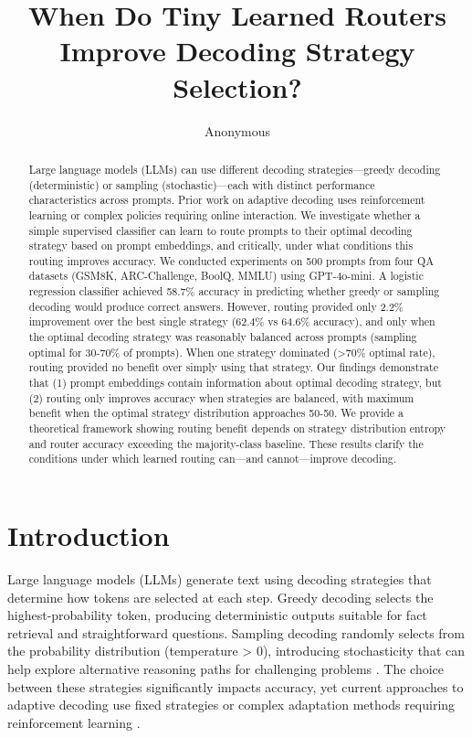 \documentclass[11pt,letterpaper]{article}
\title{When Do Tiny Learned Routers Improve Decoding Strategy Selection?}
\author{Anonymous}
\date{}
\begin{document}
\maketitle

\begin{abstract}
Large language models (LLMs) can use different decoding strategies---greedy decoding (deterministic) or sampling (stochastic)---each with distinct performance characteristics across prompts. Prior work on adaptive decoding uses reinforcement learning or complex policies requiring online interaction. We investigate whether a simple supervised classifier can learn to route prompts to their optimal decoding strategy based on prompt embeddings, and critically, under what conditions this routing improves accuracy. We conducted experiments on 500 prompts from four QA datasets (GSM8K, ARC-Challenge, BoolQ, MMLU) using GPT-4o-mini. A logistic regression classifier achieved 58.7\% accuracy in predicting whether greedy or sampling decoding would produce correct answers. However, routing provided only 2.2\% improvement over the best single strategy (62.4\% vs 64.6\% accuracy), and only when the optimal decoding strategy was reasonably balanced across prompts (sampling optimal for 30-70\% of prompts). When one strategy dominated (>70\% optimal rate), routing provided no benefit over simply using that strategy. Our findings demonstrate that (1) prompt embeddings contain information about optimal decoding strategy, but (2) routing only improves accuracy when strategies are balanced, with maximum benefit when the optimal strategy distribution approaches 50-50. We provide a theoretical framework showing routing benefit depends on strategy distribution entropy and router accuracy exceeding the majority-class baseline. These results clarify the conditions under which learned routing can---and cannot---improve decoding.
\end{abstract}

\section{Introduction}

Large language models (LLMs) generate text using decoding strategies that determine how tokens are selected at each step. Greedy decoding selects the highest-probability token, producing deterministic outputs suitable for fact retrieval and straightforward questions. Sampling decoding randomly selects from the probability distribution (temperature > 0), introducing stochasticity that can help explore alternative reasoning paths for challenging problems \cite{Song2024, Wang2022}. The choice between these strategies significantly impacts accuracy, yet current approaches to adaptive decoding use fixed strategies or complex adaptation methods requiring reinforcement learning \cite{Zhang2026, Dhuliawala2024, Chakraborty2025}.
\end{document}
